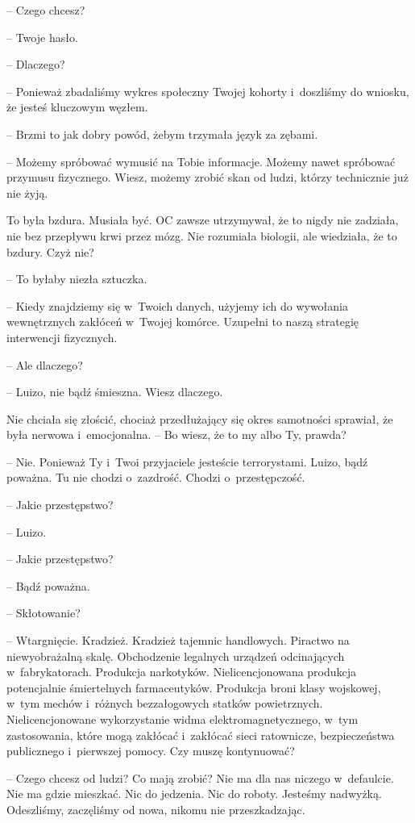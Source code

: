 \documentclass[oneside,polish,11pt,sfheadings]{mwbk}
\begin{document}
-- Czego chcesz?

-- Twoje hasło.

-- Dlaczego?

-- Ponieważ zbadaliśmy wykres społeczny Twojej kohorty i~doszliśmy do
wniosku, że jesteś kluczowym węzłem.

-- Brzmi to jak dobry powód, żebym trzymała język za zębami.

-- Możemy spróbować wymusić na Tobie informacje. Możemy nawet spróbować
przymusu fizycznego. Wiesz, możemy zrobić skan od ludzi, którzy
technicznie już nie żyją.

To była bzdura. Musiała być. OC zawsze utrzymywał, że to nigdy nie
zadziała, nie bez przepływu krwi przez mózg. Nie rozumiała biologii, ale
wiedziała, że to bzdury. Czyż nie?

-- To byłaby niezła sztuczka.

-- Kiedy znajdziemy się w~Twoich danych, użyjemy ich do wywołania
wewnętrznych zakłóceń w~Twojej komórce. Uzupełni to naszą strategię
interwencji fizycznych.

-- Ale dlaczego?

-- Luizo, nie bądź śmieszna. Wiesz dlaczego.

Nie chciała się złościć, chociaż przedłużający się okres samotności
sprawiał, że była nerwowa i~emocjonalna. -- Bo wiesz, że to my albo Ty,
prawda?

-- Nie. Ponieważ Ty i~Twoi przyjaciele jesteście terrorystami. Luizo,
bądź poważna. Tu nie chodzi o~zazdrość. Chodzi o~przestępczość.

-- Jakie przestępstwo?

-- Luizo.

-- Jakie przestępstwo?

-- Bądź poważna.

-- Skłotowanie?

-- Wtargnięcie. Kradzież. Kradzież tajemnic handlowych. Piractwo na
niewyobrażalną skalę. Obchodzenie legalnych urządzeń odcinających w~fabrykatorach. Produkcja narkotyków. Nielicencjonowana produkcja
potencjalnie śmiertelnych farmaceutyków. Produkcja broni klasy
wojskowej, w~tym mechów i~różnych bezzałogowych statków powietrznych.
Nielicencjonowane wykorzystanie widma elektromagnetycznego, w~tym
zastosowania, które mogą zakłócać i~zakłócać sieci ratownicze,
bezpieczeństwa publicznego i~pierwszej pomocy. Czy muszę kontynuować?

-- Czego chcesz od ludzi? Co mają zrobić? Nie ma dla nas niczego w~defaulcie. Nie ma gdzie mieszkać. Nic do jedzenia. Nic do roboty.
Jesteśmy nadwyżką. Odeszliśmy, zaczęliśmy od nowa, nikomu nie
przeszkadzając.
\end{document}
